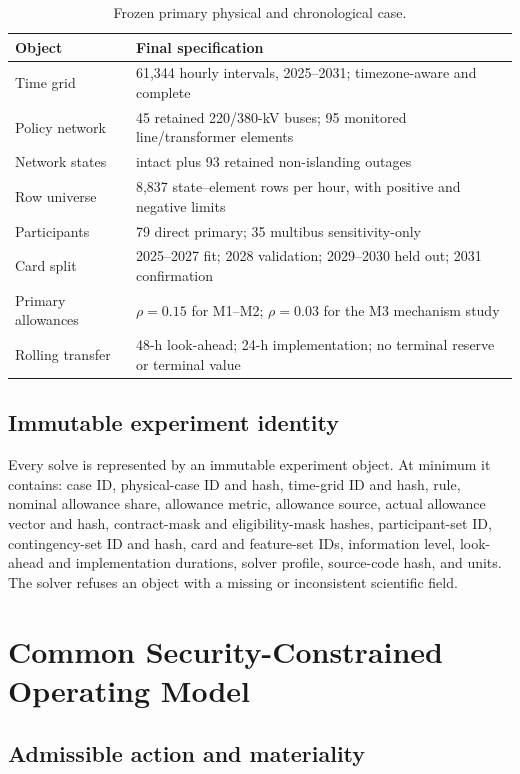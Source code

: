\documentclass[10pt,journal,onecolumn]{IEEEtran}
\begin{document}
\begin{table}[t]
\centering
\caption{Frozen primary physical and chronological case.}
\label{tab:report_primary_case}
\begin{tabularx}{\textwidth}{@{}lX@{}}
\toprule
Object & Final specification \\
\midrule
Time grid & 61,344 hourly intervals, 2025--2031; timezone-aware and complete \\
Policy network & 45 retained 220/380-kV buses; 95 monitored line/transformer elements \\
Network states & intact plus 93 retained non-islanding outages \\
Row universe & 8,837 state--element rows per hour, with positive and negative limits \\
Participants & 79 direct primary; 35 multibus sensitivity-only \\
Card split & 2025--2027 fit; 2028 validation; 2029--2030 held out; 2031 confirmation \\
Primary allowances & $\rho=0.15$ for M1--M2; $\rho=0.03$ for the M3 mechanism study \\
Rolling transfer & 48-h look-ahead; 24-h implementation; no terminal reserve or terminal value \\
\bottomrule
\end{tabularx}
\end{table}

\subsection{Immutable experiment identity}

Every solve is represented by an immutable experiment object. At minimum it
contains: case ID, physical-case ID and hash, time-grid ID and hash, rule,
nominal allowance share, allowance metric, allowance source, actual allowance
vector and hash, contract-mask and eligibility-mask hashes, participant-set
ID, contingency-set ID and hash, card and feature-set IDs, information level,
look-ahead and implementation durations, solver profile, source-code hash,
and units. The solver refuses an object with a missing or inconsistent
scientific field.

\section{Common Security-Constrained Operating Model}
\label{sec:report_common_model}

\subsection{Admissible action and materiality}
\end{document}
